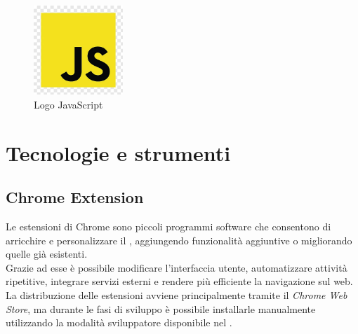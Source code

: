 \begin{figure}[H]
    \centering
    \includegraphics[width=0.3\textwidth]{img/js.png}
    \caption[Logo JavaScript]{Logo JavaScript}
\end{figure}

\section{Tecnologie e strumenti}
\subsection{Chrome Extension}
\noindent Le estensioni di Chrome sono piccoli programmi software che consentono di arricchire e personalizzare il , aggiungendo funzionalità aggiuntive o migliorando quelle già esistenti.\\
Grazie ad esse è possibile modificare l’interfaccia utente, automatizzare attività ripetitive, integrare servizi esterni e rendere più efficiente la navigazione sul web.\\ 
La distribuzione delle estensioni avviene principalmente tramite il \textit{Chrome Web Store}, ma durante le fasi di sviluppo è possibile installarle manualmente utilizzando la modalità sviluppatore disponibile nel .

